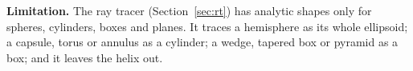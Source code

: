 \primcards
\FloatBarrier

\textbf{Limitation.} The ray tracer (Section~\ref{sec:rt}) has analytic shapes only for spheres, cylinders, boxes and
planes. It traces a hemisphere as its whole ellipsoid; a capsule, torus or annulus as a cylinder; a wedge, tapered box
or pyramid as a box; and it leaves the helix out.

